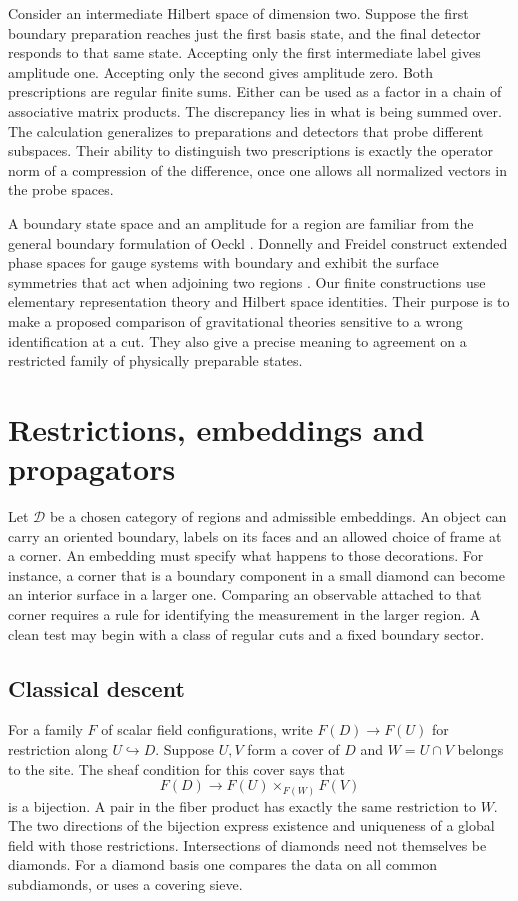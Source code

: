 \documentclass[11pt,letterpaper]{article}
\begin{document}
Consider an intermediate Hilbert space of dimension two. Suppose the first
boundary preparation reaches just the first basis state, and the final
detector responds to that same state. Accepting only the first intermediate
label gives amplitude one. Accepting only the second gives amplitude zero.
Both prescriptions are regular finite sums. Either can be used as a factor
in a chain of associative matrix products. The discrepancy lies in what is
being summed over. The calculation generalizes to preparations and detectors
that probe different subspaces. Their ability to distinguish two prescriptions
is exactly the operator norm of a compression of the difference, once one
allows all normalized vectors in the probe spaces.

A boundary state space and an amplitude for a region are familiar from the
general boundary formulation of Oeckl \cite{oeckl}. Donnelly and Freidel
construct extended phase spaces for gauge systems with boundary and exhibit
the surface symmetries that act when adjoining two regions \cite{df}. Our
finite constructions use elementary representation theory and Hilbert space
identities. Their purpose is to make a proposed comparison of gravitational
theories sensitive to a wrong identification at a cut. They also give a precise
meaning to agreement on a restricted family of physically preparable states.

\section{Restrictions, embeddings and propagators}
\label{sec:variance}
Let \(\mathcal D\) be a chosen category of regions and admissible embeddings.
An object can carry an oriented boundary, labels on its faces and an allowed
choice of frame at a corner. An embedding must specify what happens to those
decorations. For instance, a corner that is a boundary component in a small
diamond can become an interior surface in a larger one. Comparing an
observable attached to that corner requires a rule for identifying the
measurement in the larger region. A clean test may begin with a class of
regular cuts and a fixed boundary sector.

\subsection{Classical descent}
For a family \(F\) of scalar field configurations, write \(F(D)\to F(U)\)
for restriction along \(U\hookrightarrow D\). Suppose \(U,V\) form a cover
of \(D\) and \(W=U\cap V\) belongs to the site. The sheaf condition for this
cover says that
\begin{equation}
 F(D)\longrightarrow F(U)\times_{F(W)}F(V)
 \label{eq:fiber}
\end{equation}
is a bijection. A pair in the fiber product has exactly the same restriction
to \(W\). The two directions of the bijection express existence and uniqueness
of a global field with those restrictions. Intersections of diamonds need
not themselves be diamonds. For a diamond basis one compares the data on all
common subdiamonds, or uses a covering sieve.
\end{document}
